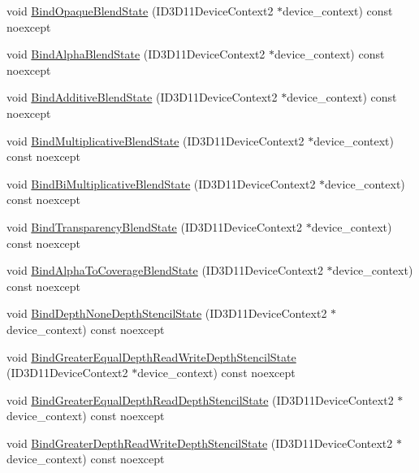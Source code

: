 \begin{DoxyCompactItemize}
\item 
void \hyperlink{classmage_1_1_rendering_state_manager_af84fb336aaa4ec5186c6c4ebf6909abf}{Bind\+Opaque\+Blend\+State} (I\+D3\+D11\+Device\+Context2 $\ast$device\+\_\+context) const noexcept
\item 
void \hyperlink{classmage_1_1_rendering_state_manager_a5f7b81f0ce25092588cbfba94e6daa7e}{Bind\+Alpha\+Blend\+State} (I\+D3\+D11\+Device\+Context2 $\ast$device\+\_\+context) const noexcept
\item 
void \hyperlink{classmage_1_1_rendering_state_manager_a4a7efd0f64898b05ee8c8ffd86be2aef}{Bind\+Additive\+Blend\+State} (I\+D3\+D11\+Device\+Context2 $\ast$device\+\_\+context) const noexcept
\item 
void \hyperlink{classmage_1_1_rendering_state_manager_a5f924acffb2ac0edae1777bffe945155}{Bind\+Multiplicative\+Blend\+State} (I\+D3\+D11\+Device\+Context2 $\ast$device\+\_\+context) const noexcept
\item 
void \hyperlink{classmage_1_1_rendering_state_manager_ae64f381c9c0427ca8302c87589470312}{Bind\+Bi\+Multiplicative\+Blend\+State} (I\+D3\+D11\+Device\+Context2 $\ast$device\+\_\+context) const noexcept
\item 
void \hyperlink{classmage_1_1_rendering_state_manager_abccd282cf58457af107d16711095cf4d}{Bind\+Transparency\+Blend\+State} (I\+D3\+D11\+Device\+Context2 $\ast$device\+\_\+context) const noexcept
\item 
void \hyperlink{classmage_1_1_rendering_state_manager_a76139a85b64c1d83e64237cf15645da4}{Bind\+Alpha\+To\+Coverage\+Blend\+State} (I\+D3\+D11\+Device\+Context2 $\ast$device\+\_\+context) const noexcept
\item 
void \hyperlink{classmage_1_1_rendering_state_manager_aeb15352ab4fbfdc8ec08055e880a524d}{Bind\+Depth\+None\+Depth\+Stencil\+State} (I\+D3\+D11\+Device\+Context2 $\ast$device\+\_\+context) const noexcept
\item 
void \hyperlink{classmage_1_1_rendering_state_manager_a88ba17c9b7c7f38ac9fb9dd17628d2fc}{Bind\+Greater\+Equal\+Depth\+Read\+Write\+Depth\+Stencil\+State} (I\+D3\+D11\+Device\+Context2 $\ast$device\+\_\+context) const noexcept
\item 
void \hyperlink{classmage_1_1_rendering_state_manager_a1e9b1b60e81df634a514f3c9c283da54}{Bind\+Greater\+Equal\+Depth\+Read\+Depth\+Stencil\+State} (I\+D3\+D11\+Device\+Context2 $\ast$device\+\_\+context) const noexcept
\item 
void \hyperlink{classmage_1_1_rendering_state_manager_a1e5f40047e76df1fdeb81e60f17a69f4}{Bind\+Greater\+Depth\+Read\+Write\+Depth\+Stencil\+State} (I\+D3\+D11\+Device\+Context2 $\ast$device\+\_\+context) const noexcept

\end{DoxyCompactItemize}
